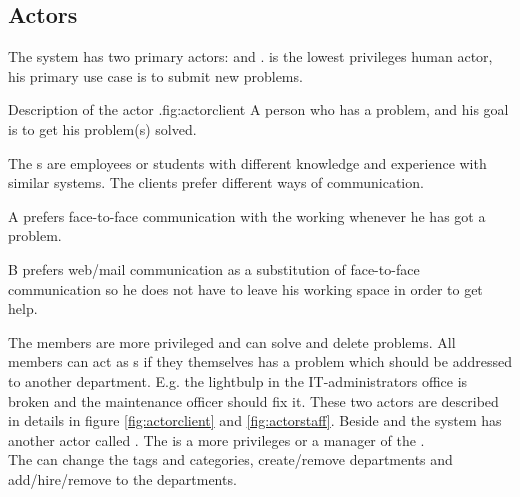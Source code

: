 \subsection{Actors}
\label{sec:actors}


The system has two primary actors:   \aclient{} and \astaff. \aclient[c] is the lowest privileges human actor, his primary use case is to submit new problems. \\

\begin{sadlist}[h]{\Aclient}{Description of the actor \aclient.}{fig:actorclient}
 A person who has a problem, and his goal is to get his problem(s) solved.

 The \aclient{}s are employees or students with different knowledge and experience with similar systems. The clients prefer different ways of communication.%

 \Aclient{} A prefers face-to-face communication with the working \astaff{} whenever he has got a problem. 

\aclient[c] B prefers web/mail communication as a substitution of face-to-face communication so he does not have to leave his working space in order to get help. 

\end{sadlist}


The \astaff{} members are more privileged and can solve and delete problems. 
All \astaff{} members can act as \aclient{}s if they themselves has a problem which should be addressed to another department. 
E.g. the lightbulp in the IT-administrators office is broken and the maintenance officer should fix it. 
These two actors are described in details in figure \ref{fig:actorclient} and \ref{fig:actorstaff}. 
Beside \astaff{} and \aclient{} the system has another actor called \sadmin{}. 
The \sadmin{} is a more privileges \astaff{} or a manager of the \astaff. \\

The \sadmin{} can change the tags and categories, create/remove departments and add/hire/remove \astaff{} to the departments. 




